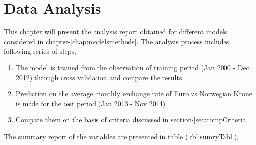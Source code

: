 \documentclass[12pt, lot, lof]{thesis}\usepackage[]{graphicx}\usepackage[]{color}
\begin{document}


\chapter{Data Analysis}
\label{ch:dataAnalysis}
This chapter will present the analysis report obtained for different models considered in chapter-\ref{chap:modelsmethods}. The analysis process includes following series of steps,

\begin{enumerate}
\item The model is trained from the observation of training period (Jan 2000 - Dec 2012) through cross validation and compare the results
\item Prediction on the average monthly exchange rate of Euro vs Norwegian Krone is made for the test period (Jan 2013 - Nov 2014)
\item Compare them on the basis of criteria discussed in section-\ref{sec:compCriteria}
\end{enumerate}

The summary report of the variables are presented in table (\ref{tbl:sumryTabl}),
\end{document}
